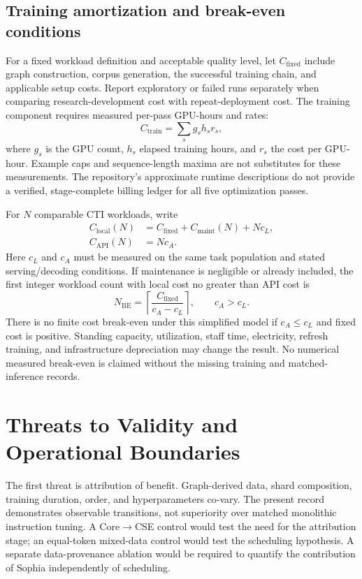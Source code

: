 \documentclass[journal]{IEEEtran}
\begin{document}
\subsection{Training amortization and break-even conditions}
For a fixed workload definition and acceptable quality level, let $C_{\mathrm{fixed}}$ include graph construction, corpus generation, the successful training chain, and applicable setup costs. Report exploratory or failed runs separately when comparing research-development cost with repeat-deployment cost. The training component requires measured per-pass GPU-hours and rates:
\begin{equation}
 C_{\mathrm{train}}=\sum_s g_s h_s r_s,
\end{equation}
where $g_s$ is the GPU count, $h_s$ elapsed training hours, and $r_s$ the cost per GPU-hour. Example caps and sequence-length maxima are not substitutes for these measurements. The repository's approximate runtime descriptions do not provide a verified, stage-complete billing ledger for all five optimization passes.

For $N$ comparable CTI workloads, write
\begin{align}
 C_{\mathrm{local}}(N)&=C_{\mathrm{fixed}}+C_{\mathrm{maint}}(N)+Nc_L,\\
 C_{\mathrm{API}}(N)&=Nc_A.
\end{align}
Here $c_L$ and $c_A$ must be measured on the same task population and stated serving/decoding conditions. If maintenance is negligible or already included, the first integer workload count with local cost no greater than API cost is
\begin{equation}
 N_{\mathrm{BE}}=\left\lceil\frac{C_{\mathrm{fixed}}}{c_A-c_L}\right\rceil,
 \qquad c_A>c_L.
\end{equation}
There is no finite cost break-even under this simplified model if $c_A\leq c_L$ and fixed cost is positive. Standing capacity, utilization, staff time, electricity, refresh training, and infrastructure depreciation may change the result. No numerical measured break-even is claimed without the missing training and matched-inference records.

\section{Threats to Validity and Operational Boundaries}\label{sec:limits}
The first threat is attribution of benefit. Graph-derived data, shard composition, training duration, order, and hyperparameters co-vary. The present record demonstrates observable transitions, not superiority over matched monolithic instruction tuning. A Core$\rightarrow$CSE control would test the need for the attribution stage; an equal-token mixed-data control would test the scheduling hypothesis. A separate data-provenance ablation would be required to quantify the contribution of Sophia independently of scheduling.
\end{document}
